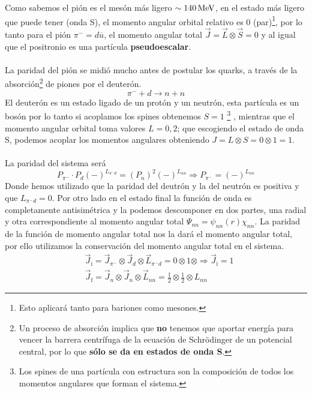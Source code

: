 Como sabemos el pión es el mesón más ligero $\sim \unit[140]{MeV}$, en el estado más ligero que puede tener (onda S), el momento angular orbital relativo es 0 (par)\footnote{Esto aplicará tanto para bariones como mesones.}, por lo tanto para el pión $\pi^-=d\overline{u}$, el momento angular total $\vec{J}=\vec{L}\otimes \vec{S}=0$ y al igual que el positronio es una partícula \textbf{pseudoescalar}.\\\\
La paridad del pión se midió mucho antes de postular los quarks, a través de la absorción\footnote{Un proceso de absorción implica que \textbf{no} tenemos que aportar energía para vencer la barrera centrífuga de la ecuación de Schrödinger de un potencial central, por lo que \textbf{sólo se da en estados de onda S}.} de piones por el deuterón.
\begin{equation}
    \pi^- +d \longrightarrow n+n
\end{equation}
El deuterón es un estado ligado de un protón y un neutrón, esta partícula es un bosón por lo tanto si acoplamos los spines obtenemos $S=1$ \footnote{Los spines de una partícula con estructura son la composición de todos los momentos angulares que forman el sistema.} , mientras que el momento angular orbital toma valores $L=0,2$; que escogiendo el estado de onda S, podemos acoplar los momentos angulares obteniendo $J=L\otimes S=0\otimes 1=1$.\\\\
La paridad del sistema será 
\begin{equation*}
    P_{\pi^-} \cdot P_d (-)^{L_{\pi^- d}}=(P_n)^2 (-)^{L_{nn}} \Rightarrow P_{\pi^-} =(-)^{L_{nn}}
\end{equation*}
Donde hemos utilizado que la paridad del deutrón y la del neutrón es positiva y que $L_{\pi^-d}=0$. Por otro lado en el estado final la función de onda es completamente antisimétrica y la podemos descomponer en dos partes, una radial y otra correspondiente al momento angular total $\Psi_{nn}=\psi_{nn}(r)\chi_{nn}$. La paridad de la función de momento angular total nos la dará el momento angular total, por ello utilizamos la conservación del momento angular total en el sistema.
\begin{equation}
    \begin{aligned}
        & \vec{J}_\mathrm{i}= \vec{J}_{\pi^-} \otimes \vec{J}_d \otimes \vec{L}_{\pi^-d}=0\otimes 1 \otimes \Rightarrow  \vec{J}_\mathrm{i}=1 \\
        & \vec{J}_\mathrm{f}= \vec{J}_n \otimes \vec{J}_n \otimes \vec{L}_{nn}=\frac{1}{2}  \otimes  \frac{1}{2} \otimes  L_{nn}
    \end{aligned}
\end{equation}
